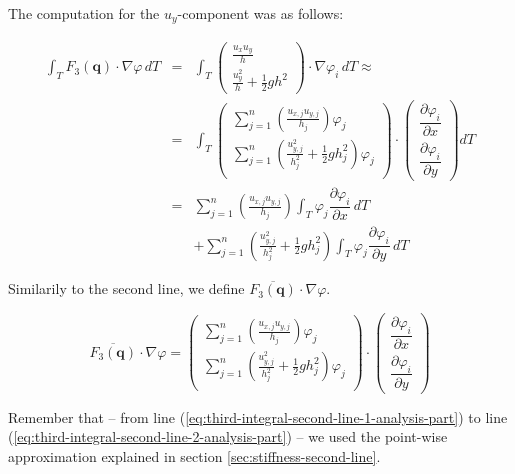 \documentclass{article}
\newcommand{\pd}[2]{\dfrac{\partial #1}{\partial #2}}
\renewcommand{\phi}{\varphi}
\begin{document}
The computation for the $u_y$-component was as follows:

\begin{eqnarray*}
  \int_T F_3\left(\mathbf{q}\right) \cdot \nabla \phi \, dT & = &
  \int_T
  \begin{pmatrix}
    \frac{u_x u_y}{h} \\ \frac{u_y^2}{h} + \frac{1}{2} g h^2
  \end{pmatrix}
  \cdot \nabla \phi_i \, dT \approx \\
  & = & \int_T
  \begin{pmatrix}
    \sum_{j=1}^n \left(\frac{u_{x,j} u_{y,j}}{h_j}\right) \phi_j \\
    \sum_{j=1}^n \left(\frac{u_{y,j}^2}{h_j^2} + \frac{1}{2} g h_j^2\right) \phi_j \\
  \end{pmatrix}
  \cdot
  \begin{pmatrix}
    \pd{\phi_i}{x} \\
    \pd{\phi_i}{y}
  \end{pmatrix} dT \\
  & = & \sum_{j=1}^n \left(\frac{u_{x,j} u_{y,j}}{h_j}\right) \int_T \phi_j \pd{\phi_i}{x} \, dT \\
  & {} & + \sum_{j=1}^n \left(\frac{u_{y,j}^2}{h_j^2} + \frac{1}{2} g h_j^2\right) \int_T \phi_j \pd{\phi_i}{y} \, dT
\end{eqnarray*}

Similarily to the second line, we define $\overline{F_3(\mathbf{q})} \cdot \nabla \phi$.

\begin{equation}
  \label{eq:point-wise-approx-result-third-line}
  \overline{F_3(\mathbf{q})} \cdot \nabla \phi =
  \begin{pmatrix}
    \sum_{j=1}^n \left(\frac{u_{x,j} u_{y,j}}{h_j}\right) \phi_j \\
    \sum_{j=1}^n \left(\frac{u_{y,j}^2}{h_j^2} + \frac{1}{2} g h_j^2\right) \phi_j \\
  \end{pmatrix}
  \cdot
  \begin{pmatrix}
    \pd{\phi_i}{x} \\
    \pd{\phi_i}{y}
  \end{pmatrix}
\end{equation}


Remember that -- from line (\ref{eq:third-integral-second-line-1-analysis-part}) to line (\ref{eq:third-integral-second-line-2-analysis-part}) -- we used the point-wise approximation explained in section \ref{sec:stiffness-second-line}.
\end{document}
